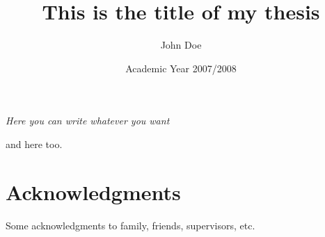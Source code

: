 \documentclass[a4paper,italian,twoside,openright,11pt]{book}
\title{This is the title of my thesis}
\author{John Doe}
\date{Academic Year 2007/2008}
\begin{document}


\thispagestyle{empty}
\mbox{}
\newpage

%
\begin{flushright}
\thispagestyle{empty}
\null{}
{\it Here you can write whatever you want

\vspace{10pt}
and here too.
}
\null
\end{flushright}
%
\thispagestyle{empty}
\mbox{}
\newpage
%
\chapter*{Acknowledgments}

Some acknowledgments to family, friends, supervisors, etc.

\thispagestyle{empty}
\mbox{}
\newpage

\tableofcontents
\listoffigures
\listoftables


\mainmatter






\label{Bibliography}


\end{document}
